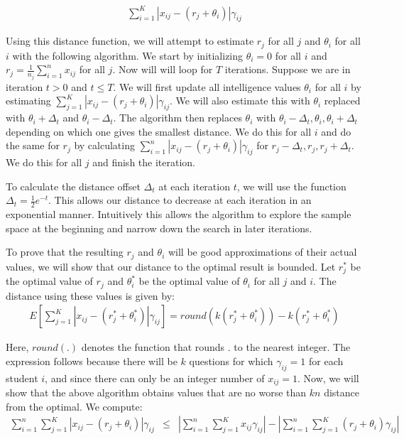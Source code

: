 \documentclass[psamsfonts]{amsart}
\begin{document}
\begin{eqnarray}
\sum_{i=1}^K | x_{ij} - (r_j + \theta_i)| \gamma_{ij}
\end{eqnarray}

Using this distance function, we will attempt to estimate $r_j$ for all $j$ and $\theta_i$ for all $i$ with the following algorithm. We start by initializing $\theta_i = 0$ for all $i$ and $r_j = \frac{1}{n_j} \sum_{i=1}^n x_{ij}$ for all $j$. Now will will loop for $T$ iterations. Suppose we are in iteration $t > 0$ and $t \leq T$. We will first update all intelligence values $\theta_i$ for all $i$ by estimating $\sum_{j=1}^K |x_{ij} - (r_j + \theta_i)| \gamma_{ij}$. We will also estimate this with $\theta_i$ replaced with $\theta_i + \Delta_t$ and $\theta_i - \Delta_t$. The algorithm then replaces $\theta_i$ with $\theta_i - \Delta_t, \theta_i, \theta_i + \Delta_t$ depending on which one gives the smallest distance. We do this for all $i$ and do the same for $r_j$ by calculating $\sum_{i=1}^n |x_{ij} - (r_j + \theta_i)| \gamma_{ij}$ for $r_j - \Delta_t, r_j, r_j + \Delta_t$. We do this for all $j$ and finish the iteration.

To calculate the distance offset $\Delta_t$ at each iteration $t$, we will use the function $\Delta_t = \frac{1}{2} e^{-t}$. This allows our distance to decrease at each iteration in an exponential manner. Intuitively this allows the algorithm to explore the sample space at the beginning and narrow down the search in later iterations.

To prove that the resulting $r_j$ and $\theta_i$ will be good approximations of their actual values, we will show that our distance to the optimal result is bounded. Let $r^*_j$ be the optimal value of $r_j$ and $\theta^*_i$ be the optimal value of $\theta_i$ for all $j$ and $i$. The distance using these values is given by:
\begin{eqnarray}
E \left[ \sum_{j=1}^K | x_{ij} - (r^*_j + \theta^*_i) | \gamma_{ij} \right] = round(k ( r^*_j + \theta^*_i)) - k ( r^*_j + \theta^*_i)
\end{eqnarray}

Here, $round(.)$ denotes the function that rounds $.$ to the nearest integer. The expression follows because there will be $k$ questions for which $\gamma_{ij} = 1$ for each student $i$, and since there can only be an integer number of $x_{ij} = 1$. Now, we will show that the above algorithm obtains values that are no worse than $kn$ distance from the optimal. We compute:
\begin{eqnarray}
\sum_{i=1}^{n} \sum_{j=1}^K | x_{ij} - (r_j + \theta_i) | \gamma_{ij} &\leq& \left| \sum_{i=1}^n \sum_{j=1}^K x_{ij} \gamma_{ij} \right| - \left| \sum_{i=1}^n \sum_{j=1}^K (r_j + \theta_i) \gamma_{ij} \right|
\end{eqnarray}
\end{document}

